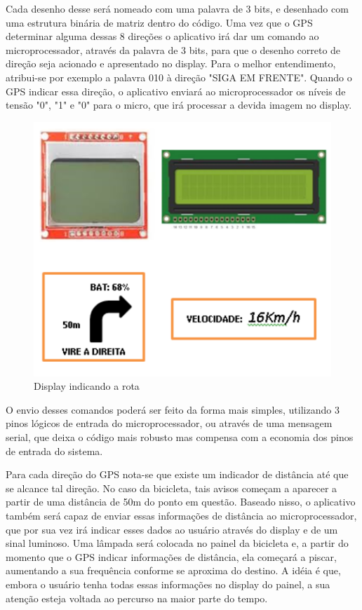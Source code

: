 	Cada desenho desse será nomeado com uma palavra de 3 bits, e desenhado com uma estrutura binária de matriz dentro do código. Uma vez que o GPS determinar alguma dessas 8 direções o aplicativo irá dar um comando ao microprocessador, através da palavra de 3 bits, para que o desenho correto de direção seja acionado e apresentado no display. 
	Para o melhor entendimento, atribui-se por exemplo a palavra 010 à direção "SIGA EM FRENTE". Quando o GPS indicar essa direção, o aplicativo enviará ao microprocessador os níveis de tensão "0", "1" e "0" para o micro, que irá processar a devida imagem no display.
	
		\graphicspath{{figuras/}}
		\begin{figure}[h!]
			\centering
			\includegraphics[scale=0.80]{Figura11_display_indicando_a_rota.PNG}
			\caption{Display indicando a rota}
			\label{img:display_indicando_a_rota}
		\end{figure}



	O envio desses comandos poderá ser feito da forma mais simples, utilizando 3 pinos lógicos de entrada do microprocessador, ou através de uma mensagem serial, que deixa o código mais robusto mas compensa com a economia dos pinos de entrada do sistema.
	
	Para cada direção do GPS nota-se que existe um indicador de distância até que se alcance tal direção. No caso da bicicleta, tais avisos começam a aparecer a partir de uma distância de 50m do ponto em questão. Baseado nisso, o aplicativo também será capaz de enviar essas informações de distância ao microprocessador, que por sua vez irá indicar esses dados ao usuário através do display e de um sinal luminoso.
	Uma lâmpada será colocada no painel da bicicleta e, a partir do momento que o GPS indicar informações de distância, ela começará a piscar, aumentando a sua frequência conforme se aproxima do destino. A idéia é que, embora o usuário tenha todas essas informações no display do painel, a sua atenção esteja voltada ao percurso na maior parte do tempo.
	

